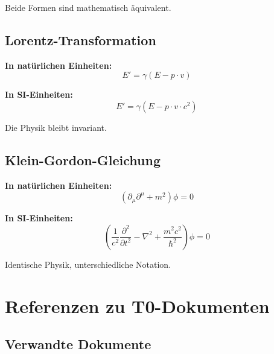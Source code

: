 	Beide Formen sind mathematisch äquivalent.
	
	\subsection{Lorentz-Transformation}
	
	\textbf{In natürlichen Einheiten:}
	\begin{equation}
		E' = \gamma (E - p \cdot v)
	\end{equation}
	
	\textbf{In SI-Einheiten:}
	\begin{equation}
		E' = \gamma (E - p \cdot v \cdot c^2)
	\end{equation}
	
	Die Physik bleibt invariant.
	
	\subsection{Klein-Gordon-Gleichung}
	
	\textbf{In natürlichen Einheiten:}
	\begin{equation}
		(\partial_\mu \partial^\mu + m^2) \phi = 0
	\end{equation}
	
	\textbf{In SI-Einheiten:}
	\begin{equation}
		\left(\frac{1}{c^2} \frac{\partial^2}{\partial t^2} - \nabla^2 + \frac{m^2c^2}{\hbar^2}\right) \phi = 0
	\end{equation}
	
	Identische Physik, unterschiedliche Notation.
	
	\section{Referenzen zu T0-Dokumenten}
	
	\subsection{Verwandte Dokumente}
	
